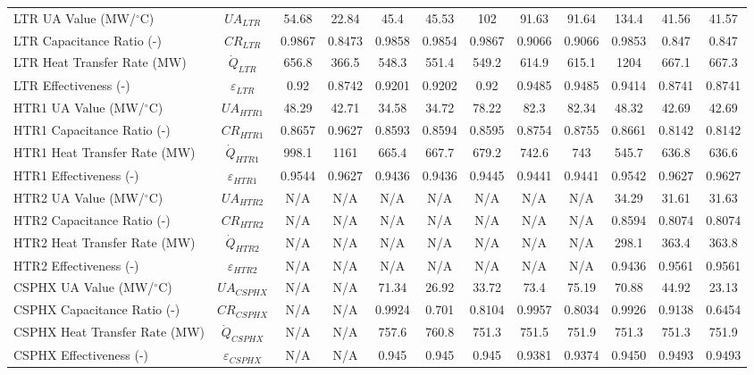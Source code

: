 \begin{paracol}{2}
\begin{specialtable}[H]
\begin{tabular}{lccccccccccc}
    LTR UA Value (MW/$^{\circ}$C)	&	$UA_{LTR}$	&	54.68	&	22.84	&	45.4	&	45.53	&	102	&	91.63	&	91.64	&	134.4	&	41.56	&	41.57	\\
    LTR Capacitance Ratio (-)	&	$CR_{LTR}$	&	0.9867	&	0.8473	&	0.9858	&	0.9854	&	0.9867	&	0.9066	&	0.9066	&	0.9853	&	0.847	&	0.847	\\
    LTR Heat Transfer Rate (MW)	&	$\dot{Q}_{LTR}$	&	656.8	&	366.5	&	548.3	&	551.4	&	549.2	&	614.9	&	615.1	&	1204	&	667.1	&	667.3	\\
    LTR Effectiveness (-)	&	$\varepsilon_{LTR}$	&	0.92	&	0.8742	&	0.9201	&	0.9202	&	0.92	&	0.9485	&	0.9485	&	0.9414	&	0.8741	&	0.8741	\\
    HTR1 UA Value (MW/$^{\circ}$C)	&	$UA_{HTR1}$	&	48.29	&	42.71	&	34.58	&	34.72	&	78.22	&	82.3	&	82.34	&	48.32	&	42.69	&	42.69	\\
    HTR1 Capacitance Ratio (-)	&	$CR_{HTR1}$	&	0.8657	&	0.9627	&	0.8593	&	0.8594	&	0.8595	&	0.8754	&	0.8755	&	0.8661	&	0.8142	&	0.8142	\\
    HTR1 Heat Transfer Rate (MW)	&	$\dot{Q}_{HTR1}$	&	998.1	&	1161	&	665.4	&	667.7	&	679.2	&	742.6	&	743	&	545.7	&	636.8	&	636.6	\\
    HTR1 Effectiveness (-)	&	$\varepsilon_{HTR1}$	&	0.9544	&	0.9627	&	0.9436	&	0.9436	&	0.9445	&	0.9441	&	0.9441	&	0.9542	&	0.9627	&	0.9627	\\
    HTR2 UA Value (MW/$^{\circ}$C)	&	$UA_{HTR2}$	&	N/A	&	N/A	&	N/A	&	N/A	&	N/A	&	N/A	&	N/A	&	34.29	&	31.61	&	31.63	\\
    HTR2 Capacitance Ratio (-)	&	$CR_{HTR2}$	&	N/A	&	N/A	&	N/A	&	N/A	&	N/A	&	N/A	&	N/A	&	0.8594	&	0.8074	&	0.8074	\\
    HTR2 Heat Transfer Rate (MW)	&	$\dot{Q}_{HTR2}$	&	N/A	&	N/A	&	N/A	&	N/A	&	N/A	&	N/A	&	N/A	&	298.1	&	363.4	&	363.8	\\
    HTR2 Effectiveness (-)	&	$\varepsilon_{HTR2}$	&	N/A	&	N/A	&	N/A	&	N/A	&	N/A	&	N/A	&	N/A	&	0.9436	&	0.9561	&	0.9561	\\
    CSPHX UA Value (MW/$^{\circ}$C)	&	$UA_{CSPHX}$	&	N/A	&	N/A	&	71.34	&	26.92	&	33.72	&	73.4	&	75.19	&	70.88	&	44.92	&	23.13	\\
    CSPHX Capacitance Ratio (-)	&	$CR_{CSPHX}$	&	N/A	&	N/A	&	0.9924	&	0.701	&	0.8104	&	0.9957	&	0.8034	&	0.9926	&	0.9138	&	0.6454	\\
    CSPHX Heat Transfer Rate (MW)	&	$\dot{Q}_{CSPHX}$	&	N/A	&	N/A	&	757.6	&	760.8	&	751.3	&	751.5	&	751.9	&	751.3	&	751.3	&	751.9	\\
    CSPHX Effectiveness (-)	&	$\varepsilon_{CSPHX}$	&	N/A	&	N/A	&	0.945	&	0.945	&	0.945	&	0.9381	&	0.9374	&	0.9450	&	0.9493	&	0.9493	\\
    \bottomrule
    \end{tabular}\\
\end{specialtable}


\end{paracol}
